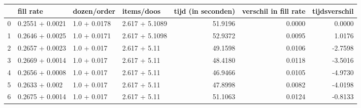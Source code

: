 \begin{tabular}{llllrrr}
\toprule
{} &        fill rate &   dozen/order &      items/doos &  tijd (in seconden) &  verschil in fill rate &  tijdsverschil \\
\midrule
0 &  0.2551 + 0.0021 &  1.0 + 0.0178 &  2.617 + 5.1089 &             51.9196 &                 0.0000 &         0.0000 \\
1 &  0.2646 + 0.0025 &  1.0 + 0.0171 &  2.617 + 5.1098 &             52.9372 &                 0.0095 &         1.0176 \\
2 &  0.2657 + 0.0023 &   1.0 + 0.017 &    2.617 + 5.11 &             49.1598 &                 0.0106 &        -2.7598 \\
3 &  0.2669 + 0.0014 &   1.0 + 0.017 &    2.617 + 5.11 &             48.4180 &                 0.0118 &        -3.5016 \\
4 &  0.2656 + 0.0008 &   1.0 + 0.017 &    2.617 + 5.11 &             46.9466 &                 0.0105 &        -4.9730 \\
5 &   0.2633 + 0.002 &   1.0 + 0.017 &    2.617 + 5.11 &             47.8998 &                 0.0082 &        -4.0198 \\
6 &  0.2675 + 0.0014 &   1.0 + 0.017 &    2.617 + 5.11 &             51.1063 &                 0.0124 &        -0.8133 \\
\bottomrule
\end{tabular}
